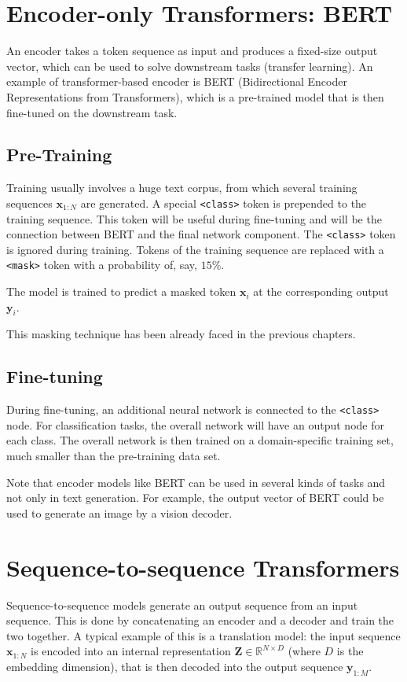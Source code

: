 \section{Encoder-only Transformers: BERT}
An encoder takes a token sequence as input and produces a fixed-size output vector, which can be used to solve downstream tasks (transfer learning).
An example of transformer-based encoder is BERT (Bidirectional Encoder Representations from Transformers), which is a pre-trained model that is then fine-tuned on the downstream task.

\subsection{Pre-Training}
Training usually involves a huge text corpus, from which several training sequences \(\mathbf{x}_{1:N}\) are generated.
A special \texttt{<class>} token is prepended to the training sequence. This token will be useful during fine-tuning and will be the connection between BERT and the final network component.
The \texttt{<class>} token is ignored during training. Tokens of the training sequence are replaced with a \texttt{<mask>} token with a probability of, say, \(15\%\).

The model is trained to predict a masked token \(\mathbf{x}_i\) at the corresponding output \(\mathbf{y}_i\).

\begin{note}{}
    This masking technique has been already faced in the previous chapters.
\end{note}

\subsection{Fine-tuning}
During fine-tuning, an additional neural network is connected to the \texttt{<class>} node. For classification tasks, the overall network will have an output node for each class.
The overall network is then trained on a domain-specific training set, much smaller than the pre-training data set.

\begin{note}{}
    Note that encoder models like BERT can be used in several kinds of tasks and not only in text generation.
    For example, the output vector of BERT could be used to generate an image by a vision decoder.
\end{note}

\section{Sequence-to-sequence Transformers}
Sequence-to-sequence models generate an output sequence from an input sequence.
This is done by concatenating an encoder and a decoder and train the two together.
A typical example of this is a translation model: the input sequence \(\mathbf{x}_{1:N}\) is encoded into an internal representation \(\mathbf{Z}\in \mathbb{R}^{N\times D}\) (where \(D\) is the embedding dimension), that is then decoded into the output sequence \(\mathbf{y}_{1:M}\).

